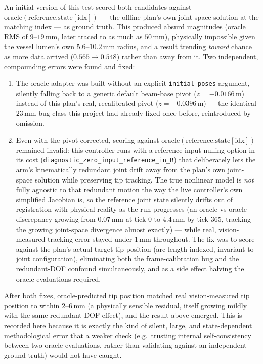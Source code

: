 \documentclass[11pt]{article}
\begin{document}
An initial version of this test scored both candidates against
$\mathrm{oracle}(\mathrm{reference.state}[\mathrm{idx}])$ --- the
offline plan's own joint-space solution at the matching index --- as
ground truth. This produced absurd magnitudes (oracle RMS of
$9$--$19\,\mathrm{mm}$, later traced to as much as $50\,\mathrm{mm}$),
physically impossible given the vessel lumen's own
$5.6$--$10.2\,\mathrm{mm}$ radius, and a result trending \emph{toward}
chance as more data arrived ($0.565\to0.548$) rather than away from
it. Two independent, compounding errors were found and fixed:
\begin{enumerate}
\item The oracle adapter was built without an explicit
  \texttt{initial\_poses} argument, silently falling back to a
  generic default beam-base pivot ($z{=}{-}0.0166\,\mathrm{m}$) instead
  of this plan's real, recalibrated pivot
  ($z{=}{-}0.0396\,\mathrm{m}$) --- the identical $23\,\mathrm{mm}$
  bug class this project had already fixed once before, reintroduced
  by omission.
\item Even with the pivot corrected, scoring against
  $\mathrm{oracle}(\mathrm{reference.state}[\mathrm{idx}])$ remained
  invalid: this controller runs with a reference-input nulling option
  in its cost (\texttt{diagnostic\_zero\_input\_reference\_in\_R}) that
  deliberately lets the arm's kinematically redundant joint drift away
  from the plan's own joint-space solution while preserving tip
  tracking. The true nonlinear model is \emph{not} fully agnostic to
  that redundant motion the way the live controller's own simplified
  Jacobian is, so the reference joint state silently drifts out of
  registration with physical reality as the run progresses (an
  oracle-vs-oracle discrepancy growing from $0.07\,\mathrm{mm}$ at
  tick 0 to $4.4\,\mathrm{mm}$ by tick 365, tracking the growing
  joint-space divergence almost exactly) --- while real,
  vision-measured tracking error stayed under $1\,\mathrm{mm}$
  throughout. The fix was to score against the plan's actual target
  tip position (arc-length indexed, invariant to joint
  configuration), eliminating both the frame-calibration bug and the
  redundant-DOF confound simultaneously, and as a side effect halving
  the oracle evaluations required.
\end{enumerate}
After both fixes, oracle-predicted tip position matched real
vision-measured tip position to within $2$--$6\,\mathrm{mm}$ (a
physically sensible residual, itself growing mildly with the same
redundant-DOF effect), and the result above emerged. This is recorded
here because it is exactly the kind of silent, large, and
state-dependent methodological error that a weaker check (e.g.\
trusting internal self-consistency between two oracle evaluations,
rather than validating against an independent ground truth) would not
have caught.
\end{document}
